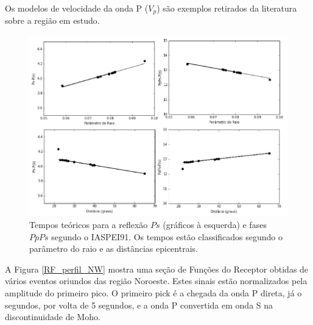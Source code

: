Os modelos de velocidade da onda P ($V_{p}$) são exemplos retirados da literatura sobre a região em estudo. 

\begin{figure}[!ht]
\centering
\includegraphics[scale=0.7]{tempo_teorico_modelo_tauptime.png}
\caption{Tempos teóricos para a reflexão $Ps$ (gráficos à esquerda) e fases $PpPs$ segundo o IASPEI91. Os tempos estão classificados segundo o parâmetro do raio e as distâncias epicentrais.}
\label{tauptime}
\end{figure}


A Figura \ref{RF_perfil_NW} mostra uma seção de Funções do Receptor obtidas de vários eventos oriundos das região Noroeste. Estes sinais estão normalizados pela amplitude do primeiro pico. O primeiro pick é a chegada da onda P direta, já o segundos, por volta de 5 segundos, e a onda P convertida em onda S na discontinuidade de Moho.


